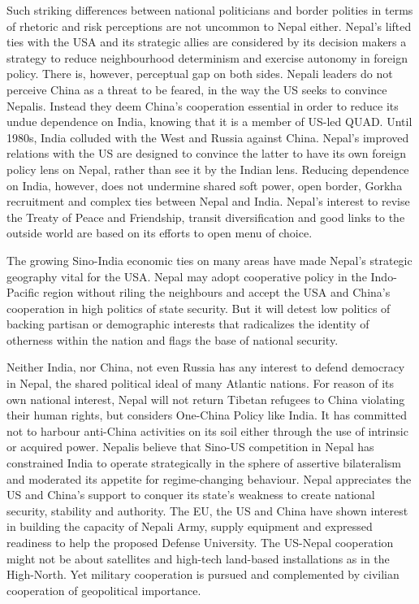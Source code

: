 \documentclass[
  openany]{book}
\begin{document}
Such striking differences between national politicians and border polities in terms of rhetoric and risk perceptions are not uncommon to Nepal either. Nepal's lifted ties with the USA and its strategic allies are considered by its decision makers a strategy to reduce neighbourhood determinism and exercise autonomy in foreign policy. There is, however, perceptual gap on both sides. Nepali leaders do not perceive China as a threat to be feared, in the way the US seeks to convince Nepalis. Instead they deem China's cooperation essential in order to reduce its undue dependence on India, knowing that it is a member of US-led QUAD. Until 1980s, India colluded with the West and Russia against China. Nepal's improved relations with the US are designed to convince the latter to have its own foreign policy lens on Nepal, rather than see it by the Indian lens. Reducing dependence on India, however, does not undermine shared soft power, open border, Gorkha recruitment and complex ties between Nepal and India. Nepal's interest to revise the Treaty of Peace and Friendship, transit diversification and good links to the outside world are based on its efforts to open menu of choice.

The growing Sino-India economic ties on many areas have made Nepal's strategic geography vital for the USA. Nepal may adopt cooperative policy in the Indo-Pacific region without riling the neighbours and accept the USA and China's cooperation in high politics of state security. But it will detest low politics of backing partisan or demographic interests that radicalizes the identity of otherness within the nation and flags the base of national security.

Neither India, nor China, not even Russia has any interest to defend democracy in Nepal, the shared political ideal of many Atlantic nations. For reason of its own national interest, Nepal will not return Tibetan refugees to China violating their human rights, but considers One-China Policy like India. It has committed not to harbour anti-China activities on its soil either through the use of intrinsic or acquired power. Nepalis believe that Sino-US competition in Nepal has constrained India to operate strategically in the sphere of assertive bilateralism and moderated its appetite for regime-changing behaviour. Nepal appreciates the US and China's support to conquer its state's weakness to create national security, stability and authority. The EU, the US and China have shown interest in building the capacity of Nepali Army, supply equipment and expressed readiness to help the proposed Defense University. The US-Nepal cooperation might not be about satellites and high-tech land-based installations as in the High-North. Yet military cooperation is pursued and complemented by civilian cooperation of geopolitical importance.
\end{document}
